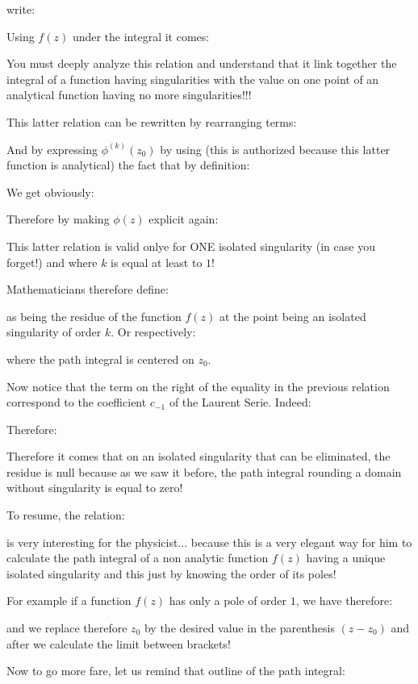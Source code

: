 	write:
	
	Using $f(z)$ under the integral it comes:
	
	You must deeply analyze this relation and understand that it link together the integral of a function having singularities with the value on one point of an analytical function having no more singularities!!!
	
	This latter relation can be rewritten by rearranging terms:
	
	And by expressing $\phi^{(k)}(z_0)$ by using (this is authorized because this latter function is analytical) the fact that by definition:
	
	We get obviously:
	
	Therefore by making $\phi(z)$ explicit again:
	
	This latter relation is valid onlye for ONE isolated singularity (in case you forget!) and where $k$ is equal at least to $1$!

	Mathematicians therefore define:
	
	as being the residue of the function $f(z)$ at the point being an isolated singularity of order $k$. Or respectively:
	
	where the path integral is centered on $z_0$.
	
	Now notice that the term on the right of the equality in the previous relation correspond to the coefficient $c_{-1}$ of the Laurent Serie. Indeed:
	
	Therefore:
	
	\begin{tcolorbox}[title=Remark,colframe=black,arc=10pt]
	Therefore it comes that on an isolated singularity that can be eliminated, the residue is null because as we saw it before, the path integral rounding a domain without singularity is equal to zero!
	\end{tcolorbox}
	To resume, the relation:
	
	is very interesting for the physicist... because this is a very elegant way for him to calculate the path integral of a non analytic function $f(z)$ having a unique isolated singularity and this just by knowing the order of its poles!
	
	For example if a function $f(z)$ has only a pole of order $1$, we have therefore:
	
	and we replace therefore $z_0$ by the desired value in the parenthesis $(z-z_0)$ and after we calculate the limit between brackets!
	
	Now to go more fare, let us remind that outline of the path integral:
	

